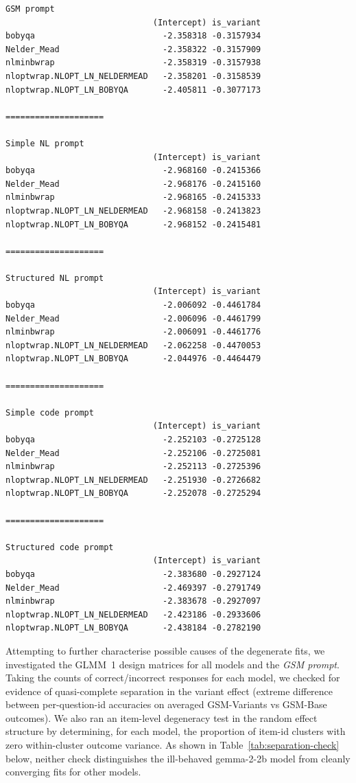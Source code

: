 \documentclass[11pt]{article}
\begin{document}
\begin{lstlisting}[caption={Comparison of GLMM 1 coefficient estimates for gemma-2-2b across optimisers.},label={lst:gemma-optimisers}]
GSM prompt
                              (Intercept) is_variant
bobyqa                          -2.358318 -0.3157934
Nelder_Mead                     -2.358322 -0.3157909
nlminbwrap                      -2.358319 -0.3157938
nloptwrap.NLOPT_LN_NELDERMEAD   -2.358201 -0.3158539
nloptwrap.NLOPT_LN_BOBYQA       -2.405811 -0.3077173

====================

Simple NL prompt
                              (Intercept) is_variant
bobyqa                          -2.968160 -0.2415366
Nelder_Mead                     -2.968176 -0.2415160
nlminbwrap                      -2.968165 -0.2415333
nloptwrap.NLOPT_LN_NELDERMEAD   -2.968158 -0.2413823
nloptwrap.NLOPT_LN_BOBYQA       -2.968152 -0.2415481

====================

Structured NL prompt
                              (Intercept) is_variant
bobyqa                          -2.006092 -0.4461784
Nelder_Mead                     -2.006096 -0.4461799
nlminbwrap                      -2.006091 -0.4461776
nloptwrap.NLOPT_LN_NELDERMEAD   -2.062258 -0.4470053
nloptwrap.NLOPT_LN_BOBYQA       -2.044976 -0.4464479

====================

Simple code prompt
                              (Intercept) is_variant
bobyqa                          -2.252103 -0.2725128
Nelder_Mead                     -2.252106 -0.2725081
nlminbwrap                      -2.252113 -0.2725396
nloptwrap.NLOPT_LN_NELDERMEAD   -2.251930 -0.2726682
nloptwrap.NLOPT_LN_BOBYQA       -2.252078 -0.2725294

====================

Structured code prompt
                              (Intercept) is_variant
bobyqa                          -2.383680 -0.2927124
Nelder_Mead                     -2.469397 -0.2791749
nlminbwrap                      -2.383678 -0.2927097
nloptwrap.NLOPT_LN_NELDERMEAD   -2.423186 -0.2933606
nloptwrap.NLOPT_LN_BOBYQA       -2.438184 -0.2782190
\end{lstlisting}

Attempting to further characterise possible causes of the degenerate fits, we investigated the GLMM~1 design matrices for all models and the \textit{GSM prompt}. Taking the counts of correct/incorrect responses for each model, we checked for evidence of quasi-complete separation in the variant effect (extreme difference between per-question-id accuracies on averaged GSM-Variants vs GSM-Base outcomes). We also ran an item-level degeneracy test in the random effect structure by determining, for each model, the proportion of item-id clusters with zero within-cluster outcome variance. 
As shown in Table~\ref{tab:separation-check} below, neither check distinguishes the ill-behaved gemma-2-2b model from cleanly converging fits for other models.
\end{document}
